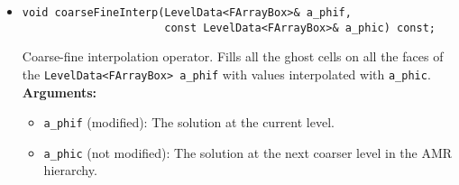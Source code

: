 \begin{itemize}
\item 
\begin{verbatim} 
void coarseFineInterp(LevelData<FArrayBox>& a_phif,
                      const LevelData<FArrayBox>& a_phic) const;
\end{verbatim}
Coarse-fine interpolation operator.  Fills all the ghost cells on 
all the faces of the \verb/LevelData<FArrayBox> a_phif/
with values interpolated with \verb/a_phic/.
\\ {\bf Arguments:} 
  \begin{itemize}
  \item
  \verb/a_phif/ (modified):
  The solution at the current level.
  \item
  \verb/a_phic/ (not modified):
  The solution at the next coarser level in the AMR hierarchy.
  \end{itemize}

\end{itemize}
